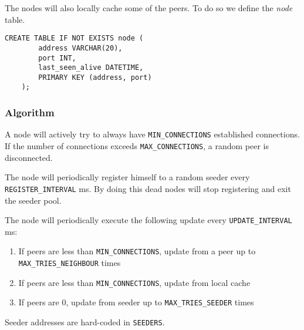 \documentclass[../documentation.tex]{subfiles}
\begin{document}
The nodes will also locally cache some of the peers.
To do so we define the \textit{node} table.

\begin{lstlisting}[style=sql]
    CREATE TABLE IF NOT EXISTS node (
        address VARCHAR(20),
        port INT,
        last_seen_alive DATETIME,
        PRIMARY KEY (address, port)
    );
\end{lstlisting}

\subsubsection{Algorithm}

A node will actively try to always have \texttt{MIN\_CONNECTIONS} established connections.
If the number of connections exceeds \texttt{MAX\_CONNECTIONS}, a random peer is disconnected.

The node will periodically register himself to a random seeder every \texttt{REGISTER\_INTERVAL} ms.
By doing this dead nodes will stop registering and exit the seeder pool.

The node will periodically execute the following update every \texttt{UPDATE\_INTERVAL} ms:

\begin{enumerate}
    \item If peers are less than \texttt{MIN\_CONNECTIONS}, update from a peer up to \texttt{MAX\_TRIES\_NEIGHBOUR} times
    \item If peers are less than \texttt{MIN\_CONNECTIONS}, update from local cache
    \item If peers are \(0\), update from seeder up to \texttt{MAX\_TRIES\_SEEDER} times
\end{enumerate}

Seeder addresses are hard-coded in \texttt{SEEDERS}.

\end{document}
